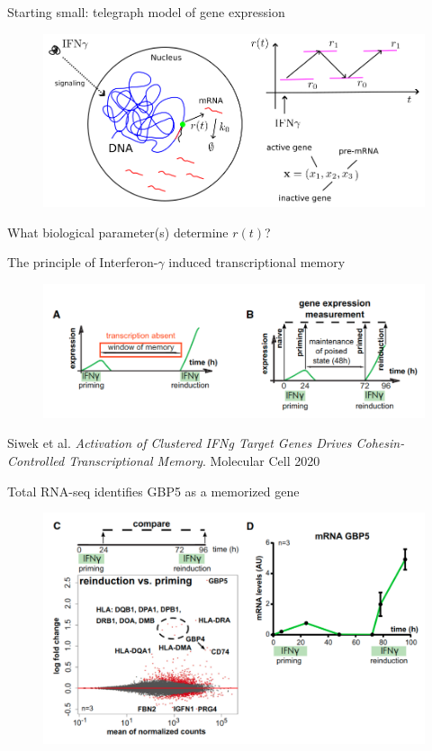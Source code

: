 \documentclass[aspectratio=1610]{beamer}					%
\begin{document}
\begin{frame}{Starting small: telegraph model of gene expression}
\begin{figure}
\includegraphics[width=14cm]{RNAFlow-2.png}
\end{figure}
What biological parameter(s) determine $r(t)$?
\end{frame}



\begin{frame}{The principle of Interferon-$\gamma$ induced transcriptional memory}
\begin{figure}
\includegraphics[width=14cm]{figure-1.png}
\caption{}
\end{figure}

Siwek et al. \textit{Activation of Clustered IFNg Target Genes Drives Cohesin-Controlled Transcriptional Memory}. Molecular Cell 2020

\end{frame}


\begin{frame}{Total RNA-seq identifies GBP5 as a memorized gene}
\begin{figure}
\includegraphics[width=13cm]{figure-2.png}
\end{figure}

\end{frame}
\end{document}
